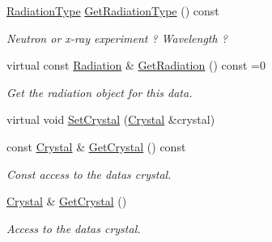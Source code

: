 \begin{DoxyCompactItemize}
\mbox{\label{class_obj_cryst_1_1_scattering_data_a78f6547a44470466f1b48cdfe9f9325d}} 
\mbox{\hyperlink{namespace_obj_cryst_a48fe50a094c607f8897378934d3d73ef}{Radiation\+Type}} \mbox{\hyperlink{class_obj_cryst_1_1_scattering_data_a78f6547a44470466f1b48cdfe9f9325d}{Get\+Radiation\+Type}} () const
\begin{DoxyCompactList}\small\item\em Neutron or x-\/ray experiment ? Wavelength ? \end{DoxyCompactList}\item 
\mbox{\label{class_obj_cryst_1_1_scattering_data_a14deaa47d5b79d12369ed5d8d4afbfbe}} 
virtual const \mbox{\hyperlink{class_obj_cryst_1_1_radiation}{Radiation}} \& \mbox{\hyperlink{class_obj_cryst_1_1_scattering_data_a14deaa47d5b79d12369ed5d8d4afbfbe}{Get\+Radiation}} () const =0
\begin{DoxyCompactList}\small\item\em Get the radiation object for this data. \end{DoxyCompactList}\item 
virtual void \mbox{\hyperlink{class_obj_cryst_1_1_scattering_data_a590a553dbea1970266a864256ebf94f3}{Set\+Crystal}} (\mbox{\hyperlink{class_obj_cryst_1_1_crystal}{Crystal}} \&crystal)
\item 
\mbox{\label{class_obj_cryst_1_1_scattering_data_af36fabc6841d45d4be8a3c3e7fd4d1ff}} 
const \mbox{\hyperlink{class_obj_cryst_1_1_crystal}{Crystal}} \& \mbox{\hyperlink{class_obj_cryst_1_1_scattering_data_af36fabc6841d45d4be8a3c3e7fd4d1ff}{Get\+Crystal}} () const
\begin{DoxyCompactList}\small\item\em Const access to the data\textquotesingle{}s crystal. \end{DoxyCompactList}\item 
\mbox{\label{class_obj_cryst_1_1_scattering_data_a82ce63a7a3f4681f75a75753870f15a6}} 
\mbox{\hyperlink{class_obj_cryst_1_1_crystal}{Crystal}} \& \mbox{\hyperlink{class_obj_cryst_1_1_scattering_data_a82ce63a7a3f4681f75a75753870f15a6}{Get\+Crystal}} ()
\begin{DoxyCompactList}\small\item\em Access to the data\textquotesingle{}s crystal. \end{DoxyCompactList}\item 

\end{DoxyCompactItemize}
